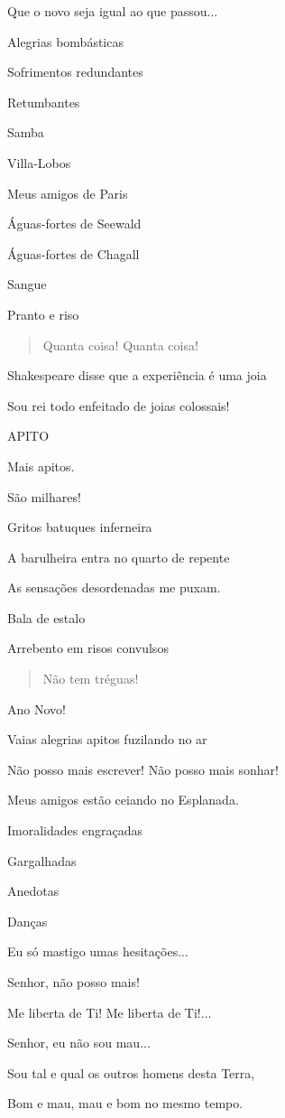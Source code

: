 Que o novo seja igual ao que passou...

Alegrias bombásticas

Sofrimentos redundantes

Retumbantes

Samba

Villa-Lobos

Meus amigos de Paris

Águas-fortes de Seewald

Águas-fortes de Chagall

Sangue

Pranto e riso

\begin{quote}
Quanta coisa! Quanta coisa!
\end{quote}

Shakespeare disse que a experiência é uma joia

Sou rei todo enfeitado de joias colossais!

APITO

Mais apitos.

São milhares!

Gritos batuques inferneira

A barulheira entra no quarto de repente

As sensações desordenadas me puxam.

Bala de estalo

Arrebento em risos convulsos

\begin{quote}
Não tem tréguas!
\end{quote}

Ano Novo!

Vaias alegrias apitos fuzilando no ar

Não posso mais escrever! Não posso mais sonhar!

Meus amigos estão ceiando no Esplanada.

Imoralidades engraçadas

Gargalhadas

Anedotas

Danças

Eu só mastigo umas hesitações...

Senhor, não posso mais!

Me liberta de Ti! Me liberta de Ti!...

Senhor, eu não sou mau...

Sou tal e qual os outros homens desta Terra,

Bom e mau, mau e bom no mesmo tempo.

